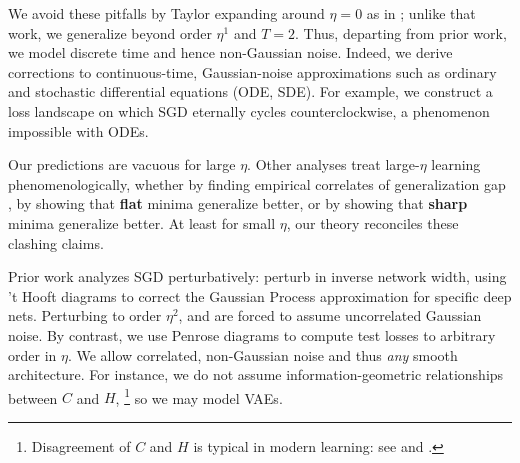 \documentclass[openany, notitlepage, justified]{tufte-book}
\theoremstyle{plain}
\theoremstyle{definition}
\begin{document}
        
        We avoid these pitfalls by Taylor expanding around $\eta=0$ as in
        \citet{ro18}; unlike that work, we generalize beyond order $\eta^1$ and
        $T=2$.
        Thus, departing from prior work, we model discrete time and hence
        non-Gaussian noise.  Indeed, we derive corrections to continuous-time,
        Gaussian-noise approximations such as ordinary and stochastic differential
        equations (ODE, SDE).  For example, we construct a loss landscape on which
        SGD eternally cycles counterclockwise, a phenomenon impossible with ODEs. 
        
    
        Our predictions are vacuous for large $\eta$.  Other analyses treat
        large-$\eta$ learning phenomenologically, whether by finding empirical
        correlates of generalization gap \citep{li18}, by showing that
        \textbf{flat} minima generalize better,\cite{ho17,ke17,wa18}
        or by showing that \textbf{sharp} minima generalize
        better.\cite{st56,di17,wu18} At least for small $\eta$, our theory
        reconciles these clashing claims.
        
    
        Prior work analyzes SGD perturbatively: \citet{dy19} perturb in inverse
        network width, using 't Hooft diagrams to correct the Gaussian Process
        approximation for specific deep nets.  Perturbing to order $\eta^2$,
        \citet{ch18} and \citet{li17} are forced to assume uncorrelated Gaussian
        noise.  By contrast, we use Penrose diagrams to compute test losses to
        arbitrary order in $\eta$.  We allow correlated, non-Gaussian
        noise and thus \emph{any} smooth architecture.  For instance, we do not
        assume information-geometric relationships between $C$ and $H$,%
        \footnote{
            Disagreement of $C$ and $H$ is typical in modern
            learning: see \citet{ro12} and \citet{ku19}.
        }
        so we may model VAEs. 
\end{document}
